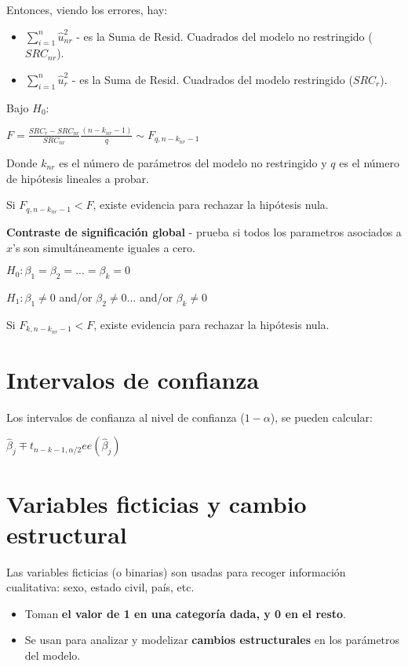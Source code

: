 \documentclass[10pt, a4paper, landscape]{extarticle}
\begin{document}
\begin{multicols}{3}
Entonces, viendo los errores, hay:

\begin{itemize}[leftmargin=*]
\item \textbf{$\sum_{i=1}^n \hat{u}_{nr}^2$} - es la Suma de Resid. Cuadrados del modelo no restringido ($SRC_{nr}$).
\item \textbf{$\sum_{i=1}^n \hat{u}_r^2$} - es la Suma de Resid. Cuadrados del modelo restringido ($SRC_r$).
\end{itemize}

Bajo $H_0$:

\begin{center}
$F = \frac{SRC_r - SRC_{nr}}{SRC_{nr}} \frac{(n-k_{nr}-1)}{q} \sim F_{q, n-k_{nr}-1}$
\end{center}

Donde $k_{nr}$ es el número de parámetros del modelo no restringido y $q$ es el número de hipótesis lineales a probar.

Si $F_{q, n-k_{nr}-1} < F$, existe evidencia para rechazar la hipótesis nula.

\textbf{Contraste de significación global} - prueba si todos los parametros asociados a $x$'s son simultáneamente iguales a cero.

$H_0: \beta_1 = \beta_2 = ... = \beta_k = 0$

$H_1: \beta_1 \neq 0$ and/or $\beta_2 \neq 0 ...$ and/or $\beta_k \neq 0$

Si $F_{k, n-k_{nr}-1} < F$, existe evidencia para rechazar la hipótesis nula.

\section*{Intervalos de confianza}

Los intervalos de confianza al nivel de confianza ($1 - \alpha$), se pueden calcular:

\begin{center}
$\hat{\beta}_j \mp t_{n-k-1, \alpha/2} ee(\hat{\beta}_j)$
\end{center}

\section*{Variables ficticias y cambio estructural}

Las variables ficticias (o binarias) son usadas para recoger información cualitativa: sexo, estado civil, país, etc.

\begin{itemize}[leftmargin=*]
\item Toman \textbf{el valor de 1 en una categoría dada, y 0 en el resto}.
\item Se usan para analizar y modelizar \textbf{cambios estructurales} en los parámetros del modelo.
\end{itemize}


\end{multicols}
\end{document}
